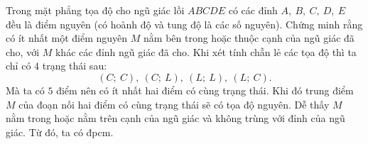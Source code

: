 \begin{ex}%
  Trong mặt phẳng tọa độ cho ngũ giác lồi $ABCDE$ có các đỉnh $A,\ B,\ C,\ D,\ E$ đều là điểm nguyên (có hoành độ và tung độ là các số nguyên). Chứng minh rằng có ít nhất một điểm nguyên $M$ nằm bên trong hoặc thuộc cạnh của ngũ giác đã cho, với $M$ khác các đỉnh ngũ giác đã cho.
\loigiai
    {Khi xét tính chẵn lẻ các tọa độ thì ta chỉ có $4$ trạng thái sau: $$(C;\ C),\ (C;\ L),\ (L;\ L),\ (L;\ C).$$
    Mà ta có $5$ điểm nên có ít nhất hai điểm có cùng trạng thái. Khi đó trung điểm $M$ của đoạn nối hai điểm có cùng trạng thái sẽ có tọa độ nguyên. Dễ thấy $M$ nằm trong hoặc nằm trên cạnh của ngũ giác và không trùng với đỉnh của ngũ giác. Từ đó, ta có đpcm.
    }

\end{ex}
